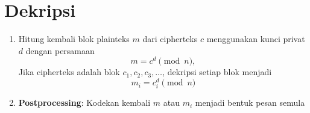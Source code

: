 \documentclass{article}
\begin{document}

\section*{Dekripsi}

\begin{enumerate}
    \item Hitung kembali blok plainteks $m$ dari cipherteks $c$ menggunakan kunci privat $d$ dengan persamaan
    \[ m = c^d \pmod{n}, \]
    Jika cipherteks adalah blok $c_1, c_2, c_3, \dots$, dekripsi setiap blok menjadi
    \[ m_i = c_i^d \pmod{n} \]
    
    \item \textbf{Postprocessing}: Kodekan kembali $m$ atau $m_i$ menjadi bentuk pesan semula
\end{enumerate}
\end{document}
